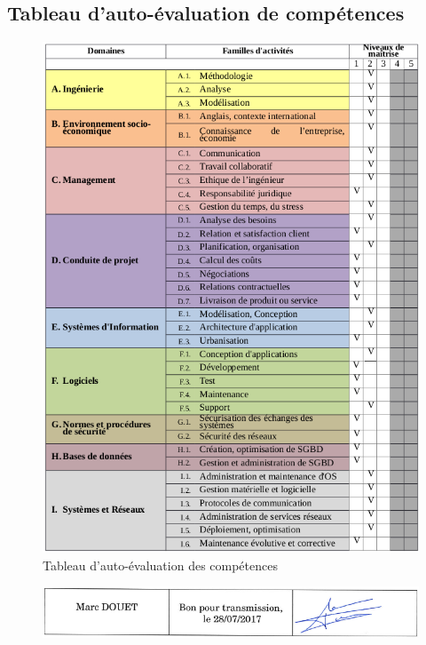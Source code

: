 \documentclass[12pt,a4paper]{report}
\begin{document}
\begin{appendix}
\chapter{Tableau d'auto-évaluation de compétences}
\begin{figure}[!ht]
    \center
    \includegraphics[scale=0.9]{./img/tableau_cpt.png}
    \caption{Tableau d'auto-évaluation des compétences}
\end{figure}

\end{appendix}

\newpage
\printnoidxglossary[type=main]

\begin{figure}[b]
	\center
    \includegraphics[scale=0.85]{./img/bordereau_signe.png}
\end{figure}
\end{document}
